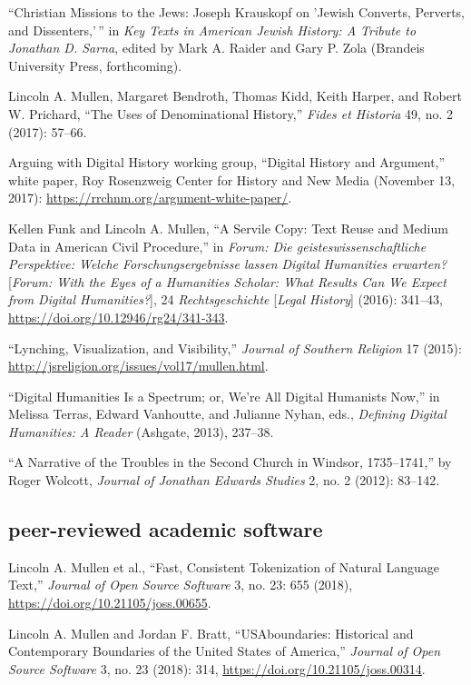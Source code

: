 \documentclass[11pt]{article}
\begin{document}
``Christian Missions to the Jews: Joseph Krauskopf on 'Jewish Converts, Perverts, and Dissenters,'\,'' in \emph{Key Texts in American Jewish History: A Tribute to Jonathan D. Sarna}, edited by Mark A. Raider and Gary P. Zola (Brandeis University Press, forthcoming).

Lincoln A. Mullen, Margaret Bendroth, Thomas Kidd, Keith Harper, and Robert W. 
Prichard, ``The Uses of Denominational History,'' \emph{Fides et Historia} 49, 
no. 2 (2017): 57--66.

Arguing with Digital History working group, ``Digital History and Argument,'' 
white paper, Roy Rosenzweig Center for History and New Media (November 13, 
2017): \url{https://rrchnm.org/argument-white-paper/}.

Kellen Funk and Lincoln A. Mullen, ``A Servile Copy: Text Reuse and Medium Data 
in American Civil Procedure,'' in \emph{Forum: Die geisteswissenschaftliche 
  Perspektive: Welche Forschungsergebnisse lassen Digital Humanities 
  erwarten?} [\emph{Forum: With the Eyes of a Humanities Scholar: What Results 
  Can We Expect from Digital Humanities?}], 24 \emph{Rechtsgeschichte} 
[\emph{Legal History}] (2016): 341--43, 
\url{https://doi.org/10.12946/rg24/341-343}.

``Lynching, Visualization, and Visibility,'' \emph{Journal of Southern 
  Religion} 17 (2015): \url{http://jsreligion.org/issues/vol17/mullen.html}.

``Digital Humanities Is a Spectrum; or, We're All Digital Humanists
Now,'' in Melissa Terras, Edward Vanhoutte, and Julianne Nyhan, eds.,
\emph{Defining Digital Humanities: A Reader} (Ashgate, 2013), 237--38.

``A Narrative of the Troubles in the Second Church in Windsor,
1735--1741,'' by Roger Wolcott, \emph{Journal of Jonathan Edwards
  Studies} 2, no. 2 (2012): 83--142.

\subsection{peer-reviewed academic software}\label{academic-software}

Lincoln A. Mullen et al., ``Fast, Consistent Tokenization of Natural Language 
Text,'' \emph{Journal of Open Source Software} 3, no. 23: 655 (2018), 
\url{https://doi.org/10.21105/joss.00655}.

Lincoln A. Mullen and Jordan F. Bratt, ``USAboundaries: Historical and 
Contemporary Boundaries of the United States of America,'' \emph{Journal of 
Open Source Software} 3, no. 23 (2018): 314, 
\url{https://doi.org/10.21105/joss.00314}.
\end{document}
